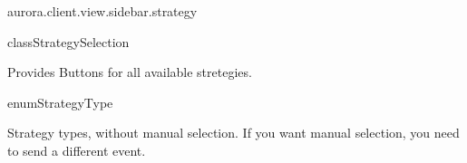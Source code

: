 \begin{texdocpackage}{aurora.client.view.sidebar.strategy}
\label{texdoclet:aurora.client.view.sidebar.strategy}

\begin{texdocclass}{class}{StrategySelection}
\label{texdoclet:aurora.client.view.sidebar.strategy.StrategySelection}
\begin{texdocclassintro}
Provides Buttons for all available stretegies.\end{texdocclassintro}
\begin{texdocclassconstructors}
\end{texdocclassconstructors}
\begin{texdocclassmethods}
\end{texdocclassmethods}
\end{texdocclass}


\begin{texdocclass}{enum}{StrategyType}
\label{texdoclet:aurora.client.view.sidebar.strategy.StrategyType}
\begin{texdocclassintro}
Strategy types, without manual selection.
 If you want manual selection, you need to send a different event.\end{texdocclassintro}
\begin{texdocenums}
\end{texdocenums}
\begin{texdocclassmethods}
\end{texdocclassmethods}
\end{texdocclass}


\end{texdocpackage}



